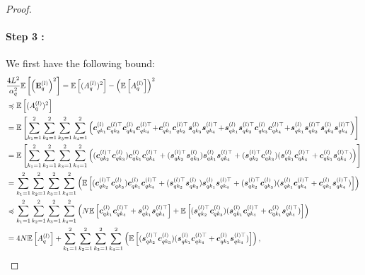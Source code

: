 \begin{proof}
\paragraph{Step 3 :}We first have the following bound:
\begin{subequations}
\setlength{\abovedisplayskip}{8pt}
\setlength{\belowdisplayskip}{8pt}
\begin{align}
&\frac{4 L^2}{\alpha_q^2} \mathbb{E}\left[\left(\mathbf{E}_q^{(l)}\right)^2\right] =\mathbb{E}\left[(A_{q}^{(l)})^2\right]-\left(\mathbb{E}\left[A_{q}^{(l)}\right]\right)^2 
\\
& \preccurlyeq \mathbb{E}\left[(A_{q}^{(l)})^2\right]  \label{eq:first_inqu_}\\
& = \mathbb{E}\left[\sum_{k_1 = 1}^2 \sum_{k_2 = 1}^2\sum_{k_3 = 1}^2\sum_{k_4 = 1}^2 \left( \bm{c}_{qk_1}^{(l)}\bm{c}_{qk_2}^{(l)\top}\bm{c}_{qk_3}^{(l)}\bm{c}_{qk_4}^{(l)\top}
\!+\!\bm{c}_{qk_1}^{(l)}\bm{c}_{qk_2}^{(l)\top}\bm{s}_{qk_3}^{(l)}\bm{s}_{qk_4}^{(l)\top} \!+\! \bm{s}_{qk_1}^{(l)}\bm{s}_{qk_2}^{(l)\top}\bm{c}_{qk_3}^{(l)}\bm{c}_{qk_4}^{(l)\top}
\!+\!\bm{s}_{qk_1}^{(l)}\bm{s}_{qk_2}^{(l)\top}\bm{s}_{qk_3}^{(l)}\bm{s}_{qk_4}^{(l)\top}   \right)\right] \\
& = \mathbb{E}\left[\sum_{k_1 = 1}^2 \sum_{k_2 = 1}^2\sum_{k_3 = 1}^2\sum_{k_4 = 1}^2 \left( (\bm{c}_{qk_2}^{(l)\top}\bm{c}_{qk_3}^{(l)})\bm{c}_{qk_1}^{(l)}\bm{c}_{qk_4}^{(l)\top} + (\bm{s}_{qk_2}^{(l)\top}\bm{s}_{qk_3}^{(l)})\bm{s}_{qk_1}^{(l)}\bm{s}_{qk_4}^{(l)\top} +
(\bm{s}_{qk_2}^{(l)\top}\bm{c}_{qk_3}^{(l)})(\bm{s}_{qk_1}^{(l)}\bm{c}_{qk_4}^{(l)\top} + \bm{c}_{qk_1}^{(l)}\bm{s}_{qk_4}^{(l)\top})\right)\right] \\
& =\sum_{k_1 = 1}^2 \sum_{k_2 = 1}^2\sum_{k_3 = 1}^2\sum_{k_4 = 1}^2 \left(\mathbb{E}\left[ (\bm{c}_{qk_2}^{(l)\top}\bm{c}_{qk_3}^{(l)})\bm{c}_{qk_1}^{(l)}\bm{c}_{qk_4}^{(l)\top} + (\bm{s}_{qk_2}^{(l)\top}\bm{s}_{qk_3}^{(l)})\bm{s}_{qk_1}^{(l)}\bm{s}_{qk_4}^{(l)\top} +
(\bm{s}_{qk_2}^{(l)\top}\bm{c}_{qk_3}^{(l)})(\bm{s}_{qk_1}^{(l)}\bm{c}_{qk_4}^{(l)\top} + \bm{c}_{qk_1}^{(l)}\bm{s}_{qk_4}^{(l)\top})\right] \right)\\
& \preccurlyeq \sum_{k_1 = 1}^2 \sum_{k_2 = 1}^2\sum_{k_3 = 1}^2\sum_{k_4 = 1}^2 \left( N \mathbb{E}\left[\bm{c}_{qk_1}^{(l)}\bm{c}_{qk_4}^{(l)\top}+\bm{s}_{qk_1}^{(l)}\bm{s}_{qk_4}^{(l)\top}\right]+\mathbb{E}\left[(\bm{s}_{qk_2}^{(l)\top}\bm{c}_{qk_3}^{(l)})(\bm{s}_{qk_1}^{(l)}\bm{c}_{qk_4}^{(l)\top} + \bm{c}_{qk_1}^{(l)}\bm{s}_{qk_4}^{(l)\top})\right] \right) \label{eq:second_inqu_} \\
&= 4 N \mathbb{E}\left[A_q^{(l)}\right] + \sum_{k_1 = 1}^2 \sum_{k_2 = 1}^2\sum_{k_3 = 1}^2\sum_{k_4 = 1}^2 \left( \mathbb{E}\left[(\bm{s}_{qk_2}^{(l)\top}\bm{c}_{qk_3}^{(l)})(\bm{s}_{qk_1}^{(l)}\bm{c}_{qk_4}^{(l)\top} + \bm{c}_{qk_1}^{(l)}\bm{s}_{qk_4}^{(l)\top})\right] \right),
\end{align}
\end{subequations}



\end{proof}
